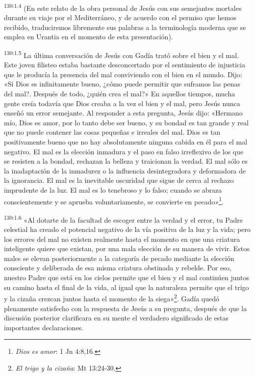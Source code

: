 \par 
\textsuperscript{130:1.4} (En este relato de la obra personal de Jesús con sus semejantes mortales durante su viaje por el Mediterráneo, y de acuerdo con el permiso que hemos recibido, traduciremos libremente sus palabras a la terminología moderna que se emplea en Urantia en el momento de esta presentación).

\par 
\textsuperscript{130:1.5} La última conversación de Jesús con Gadía trató sobre el bien y el mal. Este joven filisteo estaba bastante desconcertado por el sentimiento de injusticia que le producía la presencia del mal conviviendo con el bien en el mundo. Dijo: «Si Dios es infinitamente bueno, ¿cómo puede permitir que suframos las penas del mal?. Después de todo, ¿quién crea el mal?» En aquellos tiempos, mucha gente creía todavía que Dios creaba a la vez el bien y el mal, pero Jesús nunca enseñó un error semejante. Al responder a esta pregunta, Jesús dijo: «Hermano mío, Dios es amor, por lo tanto debe ser bueno, y su bondad es tan grande y real que no puede contener las cosas pequeñas e irreales del mal. Dios es tan positivamente bueno que no hay absolutamente ninguna cabida en él para el mal negativo. El mal es la elección inmadura y el paso en falso irreflexivo de los que se resisten a la bondad, rechazan la belleza y traicionan la verdad. El mal sólo es la inadaptación de la inmadurez o la influencia desintegradora y deformadora de la ignorancia. El mal es la inevitable oscuridad que sigue de cerca al rechazo imprudente de la luz. El mal es lo tenebroso y lo falso; cuando se abraza conscientemente y se aprueba voluntariamente, se convierte en pecado»\footnote{\textit{Dios es amor}: 1 Jn 4:8,16.}.

\par 
\textsuperscript{130:1.6} «Al dotarte de la facultad de escoger entre la verdad y el error, tu Padre celestial ha creado el potencial negativo de la vía positiva de la luz y la vida; pero los errores del mal no existen realmente hasta el momento en que una criatura inteligente quiere que existan, por una mala elección de su manera de vivir. Estos males se elevan posteriormente a la categoría de pecado mediante la elección consciente y deliberada de esa misma criatura obstinada y rebelde. Por eso, nuestro Padre que está en los cielos permite que el bien y el mal continúen juntos su camino hasta el final de la vida, al igual que la naturaleza permite que el trigo y la cizaña crezcan juntos hasta el momento de la siega»\footnote{\textit{El trigo y la cizaña}: Mt 13:24-30.}. Gadía quedó plenamente satisfecho con la respuesta de Jesús a su pregunta, después de que la discusión posterior clarificara en su mente el verdadero significado de estas importantes declaraciones.

